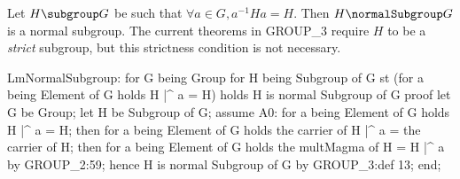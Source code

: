 \M Let $H\subgroup G$ be such that $\forall a\in G, a^{-1}Ha=H$.
Then $H\normalSubgroup G$ is a normal subgroup. The current theorems in
{\Tt{}GROUP{\_}3\nwendquote} require $H$ to be a \emph{strict} subgroup, but this
strictness condition is not necessary.

\nwenddocs{}\endmoddef\nwstartdeflinemarkup\nwenddeflinemarkup
LmNormalSubgroup:
for G being Group
for H being Subgroup of G
st (for a being Element of G holds H |^ a = H)
holds H is normal Subgroup of G
proof
  let G be Group;
  let H be Subgroup of G;
  assume A0: for a being Element of G holds H |^ a = H;
  then for a being Element of G holds the carrier of H |^ a = the carrier of H;
  then for a being Element of G holds the multMagma of H = H |^ a by GROUP_2:59;
  hence H is normal Subgroup of G by GROUP_3:def 13;
end;

\nwendcode{}\nwdocspar
\nwenddocs{}

%
%
%


